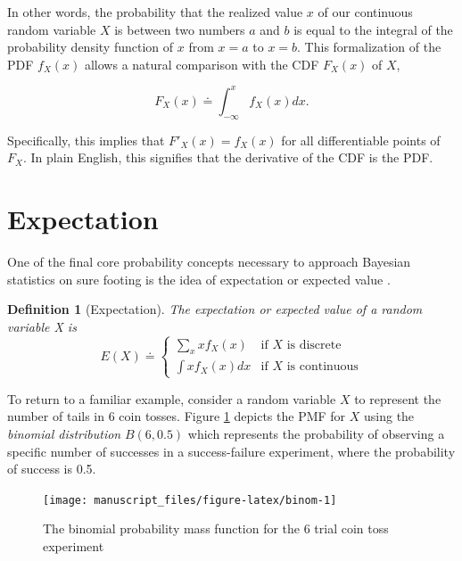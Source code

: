 \documentclass[
  12pt,
  twoside]{book}
\theoremstyle{definition}
\newtheorem{definition}{Definition}[chapter]
\theoremstyle{definition}
\theoremstyle{definition}
\theoremstyle{remark}
\begin{document}
In other words, the probability that the realized value \(x\) of our continuous random variable \(X\) is between two numbers \(a\) and \(b\) is equal to the integral of the probability density function of \(x\) from \(x = a\) to \(x = b\).
This formalization of the PDF \(f_X(x)\) allows a natural comparison with the CDF \(F_X(x)\) of \(X\),

\[F_X(x) \doteq \int_{-\infty}^{x}f_X(x)dx.\]

Specifically, this implies that \(F'_X(x)=f_X(x)\) for all differentiable points of \(F_X\).
In plain English, this signifies that the derivative of the CDF is the PDF.

\hypertarget{expectation}{%
\section{Expectation}\label{expectation}}

One of the final core probability concepts necessary to approach Bayesian statistics on sure footing is the idea of expectation or expected value \citep[  3.1]{Wasserman2004}.

\begin{definition}[Expectation]
\protect\hypertarget{def:e}{}{\label{def:e} {} }\emph{The expectation or expected value of a random variable X is}
\[E(X) \doteq \begin{cases}\sum_{x}xf_{X}(x) & \textrm{if }X\textrm{ is discrete}\\\int{xf_{X}(x)dx} & \textrm{if }X\textrm{ is continuous}\end{cases}\]
\end{definition}

To return to a familiar example, consider a random variable \(X\) to represent the number of tails in 6 coin tosses. Figure \ref{fig:binom} depicts the PMF for \(X\) using the \emph{binomial distribution} \(B(6,0.5)\) which represents the probability of observing a specific number of successes in a success-failure experiment, where the probability of success is 0.5.

\begin{figure}

{\centering \texttt{[image: manuscript\_files/figure-latex/binom-1]} 

}

\caption{The binomial probability mass function for the 6 trial coin toss experiment}\label{fig:binom}
\end{figure}
\end{document}
